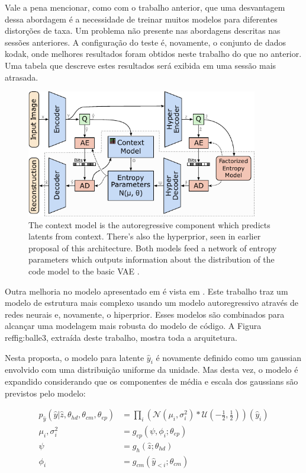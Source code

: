 Vale a pena mencionar, como com o trabalho anterior, que uma desvantagem dessa abordagem é a necessidade de treinar muitos modelos para diferentes distorções de taxa. Um problema não presente nas abordagens descritas nas sessões anteriores. A configuração do teste é, novamente, o conjunto de dados kodak, onde melhores resultados foram obtidos neste trabalho do que no anterior. Uma tabela que descreve estes resultados será exibida em uma sessão mais atrasada.

\begin{figure}
	\centering
	\includegraphics[width=0.90\textwidth]{figuras/balle_3.pdf}
	\caption{The context model is the autoregressive component which predicts latents from context. There's also the hyperprior, seen in earlier proposal of this architecture. Both models feed a network of entropy parameters which outputs information about the distribution of the code model to the basic VAE \cite{Autoregressive2018Minnen}.}
	\label{fig:figuras/balle3}
\end{figure}

Outra melhoria no modelo apresentado em \cite{Variational2018Balle} é vista em \cite{Autoregressive2018Minnen}. Este trabalho traz um modelo de estrutura mais complexo usando um modelo autoregressivo através de redes neurais e, novamente, o hiperprior. Esses modelos são combinados para alcançar uma modelagem mais robusta do modelo de código. A Figura ref{fig:balle3}, extraída deste trabalho, mostra toda a arquitetura.

Nesta proposta, o modelo para latente $\hat{y}_i$ é novamente definido como um gaussian envolvido com uma distribuição uniforme da unidade. Mas desta vez, o modelo é expandido considerando que os componentes de média e escala dos gaussians são previstos pelo modelo:

\begin{equation}
\begin{aligned}
p_{\hat{y}}(\hat{y}|\hat{z}, \theta_{hd}, \theta_{cm}, \theta_{ep}) &= \prod_{i}^{} (\mathcal{N}(\mu_i, \sigma_i^2) * \mathcal{U}(-\frac{1}{2}, \frac{1}{2}))(\hat{y}_i) \\
\mu_i, \sigma_i^2 &= g_{ep}(\psi, \phi_i; \theta_{ep}) \\
\psi &= g_h (\hat{z};\theta_{hd}) \\
\phi_i &= g_{cm}(\hat{y}_{<i}; \theta_{cm})
\end{aligned} 
\end{equation}

